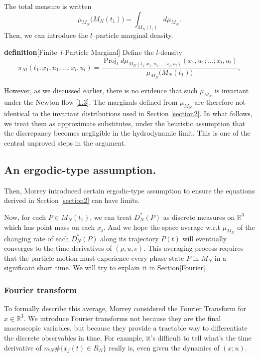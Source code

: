 \documentclass[11pt]{article}
\begin{document}
The total measure is written
\[
\mu_{M_N}\big(M_N(t_1)\big)
=
\int_{M_N(t_1)} d\mu_{M_N}.
\]
Then, we can introduce the $l$--particle marginal density.

\textbf{definition}[Finite--$l$-Particle Marginal]
Define the $l$-density
\[
\pi_{N l}(t_1; x_1,u_1;\dots;x_l,u_l)
=\frac{\operatorname{Proj}_ld\mu_{M_N(t_1; x_1,u_1;\dots;x_l,u_l)}(x_1,u_1;\dots;x_l,u_l)}{\mu_{M_N}\big(M_N(t_1)\big)},
\tag{3.4}\label{3.4}
\]

However, as we discussed earlier, there is no evidence that such $\mu_{M_N}$ is invariant under the Newton flow \eqref{1.3}. The marginals defined from $\mu_{M_N}$
are therefore not identical to the invariant distributions used in Section \ref{section2}. In what follows, we treat them as approximate substitutes, under the heuristic assumption that the discrepancy becomes negligible in the hydrodynamic limit. This is one of the central unproved steps in the argument.

\subsection{An ergodic-type assumption.}
Then, Morrey introduced certain ergodic-type assumption to ensure the equations derived in Section \ref{section2} can have limits.

Now, for each $P\in M_N(t_1)$, we can treat $D^*_N(P)$ as discrete measures on $\mathbb{R}^3$ which has point mass on each $x_j$. And we hope the space average w.r.t $\mu_{M_N}$ of the changing rate of each $D^*_N(P)$ along its trajectory $P(t)$ will eventually converges to the time derivatives of $(\rho,u,e)$. This averaging process requires that the particle motion must experience every phase state $P$ in $M_N$ in a significant short time. We will try to explain it in Section\ref{Fourier}.  

\subsubsection{Fourier transform}
To formally describe this average, Morrey considered the Fourier Transform for $x\in\mathbb{R}^3$. We introduce Fourier transforms not because they are the final macroscopic variables, but because they provide a tractable way to differentiate the discrete observables in time. For example, it's difficult to tell what's the time derivative of $m_N\#\{x_j(t)\in R_N\}$ really is, even given the dynamics of $(x;u)$.
\end{document}
